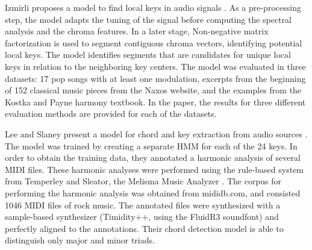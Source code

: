 
Izmirli proposes a model to find local keys in audio signals
\cite{izmirli2007localized}. As a pre-processing step, the
model adapts the tuning of the signal before computing the
spectral analysis and the chroma features. In a later stage,
Non-negative matrix factorization is used to segment
contiguous chroma vectors, identifying potential local keys.
The model identifies segments that are candidates for unique
local keys in relation to the neighboring key centers. The
model was evaluated in three datasets: 17 pop songs with at
least one modulation, excerpts from the beginning of 152
classical music pieces from the Naxos website, and the
examples from the Kostka and Payne harmony textbook. In the
paper, the results for three different evaluation methods
are provided for each of the datasets.

Lee and Slaney present a model for chord and key extraction
from audio sources \cite{lee2007unified}. The model was
trained by creating a separate HMM for each of the 24 keys.
In order to obtain the training data, they annotated a
harmonic analysis of several MIDI files. These harmonic
analyses were performed using the rule-based system from
Temperley and Sleator, the Melisma Music Analyzer
\cite{temperley2004cognition}. The corpus for performing the
harmonic analysis was obtained from mididb.com, and
consisted 1046 MIDI files of rock music. The annotated files
were synthesized with a sample-based synthesizer
(Timidity++, using the FluidR3 soundfont) and perfectly
aligned to the annotations. Their chord detection model is
able to distinguish only major and minor triads.




